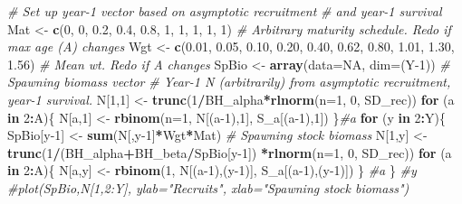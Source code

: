 \documentclass[
]{krantz}
\makeatletter
\newenvironment{Shaded}{\begin{snugshade}}{\end{snugshade}}
\newcommand{\AttributeTok}[1]{\textcolor[rgb]{0.27,0.27,0.27}{#1}}
\newcommand{\CommentTok}[1]{\textcolor[rgb]{0.37,0.37,0.37}{\textit{#1}}}
\newcommand{\ConstantTok}[1]{\textcolor[rgb]{0.37,0.37,0.37}{#1}}
\newcommand{\ControlFlowTok}[1]{\textcolor[rgb]{0.27,0.27,0.27}{\textbf{#1}}}
\newcommand{\DecValTok}[1]{\textcolor[rgb]{0.06,0.06,0.06}{#1}}
\newcommand{\FloatTok}[1]{\textcolor[rgb]{0.06,0.06,0.06}{#1}}
\newcommand{\FunctionTok}[1]{\textcolor[rgb]{0.27,0.27,0.27}{\textbf{#1}}}
\newcommand{\NormalTok}[1]{#1}
\newcommand{\OtherTok}[1]{\textcolor[rgb]{0.37,0.37,0.37}{#1}}
\newcommand{\SpecialCharTok}[1]{\textcolor[rgb]{0.43,0.43,0.43}{\textbf{#1}}}
\newenvironment{kframe}{%
\medskip{}
\setlength{\fboxsep}{.8em}
 \def\at@end@of@kframe{}%
 \ifinner\ifhmode%
  \def\at@end@of@kframe{\end{minipage}}%
  \begin{minipage}{\columnwidth}%
 \fi\fi%
 \def\FrameCommand##1{\hskip\@totalleftmargin \hskip-\fboxsep
 \colorbox{shadecolor}{##1}\hskip-\fboxsep
     \hskip-\linewidth \hskip-\@totalleftmargin \hskip\columnwidth}%
 \MakeFramed {\advance\hsize-\width
   \@totalleftmargin\z@ \linewidth\hsize
   \@setminipage}}%
 {\par\unskip\endMakeFramed%
 \at@end@of@kframe}
\renewenvironment{Shaded}{\begin{kframe}}{\end{kframe}}
\makeatother
\begin{document}
\begin{Shaded}
\begin{Highlighting}[]
\CommentTok{\# Set up year{-}1 vector based on asymptotic recruitment}
\CommentTok{\# and year{-}1 survival}
\NormalTok{Mat }\OtherTok{\textless{}{-}} \FunctionTok{c}\NormalTok{(}\DecValTok{0}\NormalTok{, }\DecValTok{0}\NormalTok{, }\FloatTok{0.2}\NormalTok{, }\FloatTok{0.4}\NormalTok{, }\FloatTok{0.8}\NormalTok{, }\DecValTok{1}\NormalTok{, }\DecValTok{1}\NormalTok{, }\DecValTok{1}\NormalTok{, }\DecValTok{1}\NormalTok{, }\DecValTok{1}\NormalTok{) }
\CommentTok{\# Arbitrary maturity schedule. Redo if max age (A) changes}
\NormalTok{Wgt }\OtherTok{\textless{}{-}} \FunctionTok{c}\NormalTok{(}\FloatTok{0.01}\NormalTok{, }\FloatTok{0.05}\NormalTok{, }\FloatTok{0.10}\NormalTok{, }\FloatTok{0.20}\NormalTok{, }\FloatTok{0.40}\NormalTok{, }\FloatTok{0.62}\NormalTok{, }\FloatTok{0.80}\NormalTok{, }\FloatTok{1.01}\NormalTok{, }\FloatTok{1.30}\NormalTok{, }\FloatTok{1.56}\NormalTok{) }
\CommentTok{\# Mean wt. Redo if A changes}
\NormalTok{SpBio }\OtherTok{\textless{}{-}} \FunctionTok{array}\NormalTok{(}\AttributeTok{data=}\ConstantTok{NA}\NormalTok{, }\AttributeTok{dim=}\NormalTok{(Y}\DecValTok{{-}1}\NormalTok{)) }\CommentTok{\# Spawning biomass vector}
\CommentTok{\# Year{-}1 N (arbitrarily) from asymptotic recruitment, year{-}1 survival.}
\NormalTok{N[}\DecValTok{1}\NormalTok{,}\DecValTok{1}\NormalTok{] }\OtherTok{\textless{}{-}} \FunctionTok{trunc}\NormalTok{(}\DecValTok{1}\SpecialCharTok{/}\NormalTok{BH\_alpha}\SpecialCharTok{*}\FunctionTok{rlnorm}\NormalTok{(}\AttributeTok{n=}\DecValTok{1}\NormalTok{, }\DecValTok{0}\NormalTok{, SD\_rec))}
\ControlFlowTok{for}\NormalTok{ (a }\ControlFlowTok{in} \DecValTok{2}\SpecialCharTok{:}\NormalTok{A)\{}
\NormalTok{  N[a,}\DecValTok{1}\NormalTok{] }\OtherTok{\textless{}{-}} \FunctionTok{rbinom}\NormalTok{(}\AttributeTok{n=}\DecValTok{1}\NormalTok{, N[(a}\DecValTok{{-}1}\NormalTok{),}\DecValTok{1}\NormalTok{], S\_a[(a}\DecValTok{{-}1}\NormalTok{),}\DecValTok{1}\NormalTok{])}
\NormalTok{\}}\CommentTok{\#a}
\ControlFlowTok{for}\NormalTok{ (y }\ControlFlowTok{in} \DecValTok{2}\SpecialCharTok{:}\NormalTok{Y)\{}
\NormalTok{  SpBio[y}\DecValTok{{-}1}\NormalTok{] }\OtherTok{\textless{}{-}} \FunctionTok{sum}\NormalTok{(N[,y}\DecValTok{{-}1}\NormalTok{]}\SpecialCharTok{*}\NormalTok{Wgt}\SpecialCharTok{*}\NormalTok{Mat) }\CommentTok{\# Spawning stock biomass}
\NormalTok{  N[}\DecValTok{1}\NormalTok{,y] }\OtherTok{\textless{}{-}} \FunctionTok{trunc}\NormalTok{(}\DecValTok{1}\SpecialCharTok{/}\NormalTok{(BH\_alpha}\SpecialCharTok{+}\NormalTok{BH\_beta}\SpecialCharTok{/}\NormalTok{SpBio[y}\DecValTok{{-}1}\NormalTok{])}
                  \SpecialCharTok{*}\FunctionTok{rlnorm}\NormalTok{(}\AttributeTok{n=}\DecValTok{1}\NormalTok{, }\DecValTok{0}\NormalTok{, SD\_rec))}
  \ControlFlowTok{for}\NormalTok{ (a }\ControlFlowTok{in} \DecValTok{2}\SpecialCharTok{:}\NormalTok{A)\{}
\NormalTok{    N[a,y] }\OtherTok{\textless{}{-}} \FunctionTok{rbinom}\NormalTok{(}\DecValTok{1}\NormalTok{, N[(a}\DecValTok{{-}1}\NormalTok{),(y}\DecValTok{{-}1}\NormalTok{)], S\_a[(a}\DecValTok{{-}1}\NormalTok{),(y}\DecValTok{{-}1}\NormalTok{)])}
\NormalTok{  \} }\CommentTok{\#a}
\NormalTok{\} }\CommentTok{\#y}
\CommentTok{\#plot(SpBio,N[1,2:Y], ylab="Recruits", xlab="Spawning stock biomass")}


\end{Highlighting}
\end{Shaded}
\end{document}
